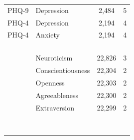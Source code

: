 \begin{table}[t]
\begin{tabular*}{\linewidth}{@{\extracolsep{\fill}}llcc}
PHQ-9 & Depression & 2,484 & 5 \\ 
PHQ-4 & Depression & 2,194 & 4 \\ 
PHQ-4 & Anxiety & 2,194 & 4 \\ 
{\cellcolor[HTML]{FFF8E1}{BDI}} & {\cellcolor[HTML]{FFF8E1}{Depression}} & {\cellcolor[HTML]{FFF8E1}{836}} & {\cellcolor[HTML]{FFF8E1}{1}} \\ 
{\cellcolor[HTML]{FFF8E1}{GAD-7}} & {\cellcolor[HTML]{FFF8E1}{Anxiety}} & {\cellcolor[HTML]{FFF8E1}{279}} & {\cellcolor[HTML]{FFF8E1}{1}} \\ 
{\cellcolor[HTML]{FFF8E1}{MFQ}} & {\cellcolor[HTML]{FFF8E1}{Depression}} & {\cellcolor[HTML]{FFF8E1}{106}} & {\cellcolor[HTML]{FFF8E1}{1}} \\ 
\midrule\addlinespace[2.5pt]
\multicolumn{4}{l}{{\bfseries Personality}} \\[2.5pt] 
\midrule\addlinespace[2.5pt]
 & Neuroticism & 22,826 & 3 \\ 
 & Conscientiousness & 22,304 & 2 \\ 
 & Openness & 22,303 & 2 \\ 
 & Agreeableness & 22,300 & 2 \\ 
 & Extraversion & 22,299 & 2 \\ 
{\cellcolor[HTML]{FFF8E1}{}} & {\cellcolor[HTML]{FFF8E1}{Honesty-Humility}} & {\cellcolor[HTML]{FFF8E1}{485}} & {\cellcolor[HTML]{FFF8E1}{1}} \\ 
\midrule\addlinespace[2.5pt]
\multicolumn{4}{l}{{\bfseries Psychopathology and Neurodevelopmental Traits}} \\[2.5pt] 
\midrule\addlinespace[2.5pt]
{\cellcolor[HTML]{FFF8E1}{PID-5}} & {\cellcolor[HTML]{FFF8E1}{Antagonism}} & {\cellcolor[HTML]{FFF8E1}{485}} & {\cellcolor[HTML]{FFF8E1}{1}} \\ 
{\cellcolor[HTML]{FFF8E1}{PID-5}} & {\cellcolor[HTML]{FFF8E1}{Detachment}} & {\cellcolor[HTML]{FFF8E1}{485}} & {\cellcolor[HTML]{FFF8E1}{1}} \\ 
{\cellcolor[HTML]{FFF8E1}{PID-5}} & {\cellcolor[HTML]{FFF8E1}{Disinhibition}} & {\cellcolor[HTML]{FFF8E1}{485}} & {\cellcolor[HTML]{FFF8E1}{1}} \\ 
{\cellcolor[HTML]{FFF8E1}{PID-5}} & {\cellcolor[HTML]{FFF8E1}{Negative Affect}} & {\cellcolor[HTML]{FFF8E1}{485}} & {\cellcolor[HTML]{FFF8E1}{1}} \\ 
{\cellcolor[HTML]{FFF8E1}{PID-5}} & {\cellcolor[HTML]{FFF8E1}{Psychoticism}} & {\cellcolor[HTML]{FFF8E1}{485}} & {\cellcolor[HTML]{FFF8E1}{1}} \\ 
{\cellcolor[HTML]{FFF8E1}{SPQ}} & {\cellcolor[HTML]{FFF8E1}{Constricted Affect}} & {\cellcolor[HTML]{FFF8E1}{485}} & {\cellcolor[HTML]{FFF8E1}{1}} \\ 

\end{tabular*}
\end{table}

